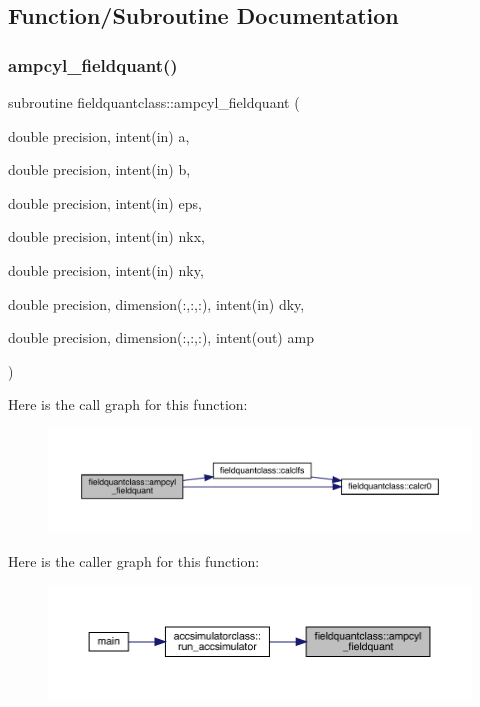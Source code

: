 \subsection{Function/\+Subroutine Documentation}
\mbox{\label{namespacefieldquantclass_a0cf12c2453dd024814caca1b9dbbb9a5}} 
\subsubsection{\texorpdfstring{ampcyl\_fieldquant()}{ampcyl\_fieldquant()}}
{\footnotesize\ttfamily subroutine fieldquantclass\+::ampcyl\+\_\+fieldquant (\begin{DoxyParamCaption}\item[{double precision, intent(in)}]{a,  }\item[{double precision, intent(in)}]{b,  }\item[{double precision, intent(in)}]{eps,  }\item[{double precision, intent(in)}]{nkx,  }\item[{double precision, intent(in)}]{nky,  }\item[{double precision, dimension(\+:,\+:,\+:), intent(in)}]{dky,  }\item[{double precision, dimension(\+:,\+:,\+:), intent(out)}]{amp }\end{DoxyParamCaption})}

Here is the call graph for this function\+:\nopagebreak
\begin{figure}[H]
\begin{center}
\leavevmode
\includegraphics[width=350pt]{namespacefieldquantclass_a0cf12c2453dd024814caca1b9dbbb9a5_cgraph}
\end{center}
\end{figure}
Here is the caller graph for this function\+:\nopagebreak
\begin{figure}[H]
\begin{center}
\leavevmode
\includegraphics[width=350pt]{namespacefieldquantclass_a0cf12c2453dd024814caca1b9dbbb9a5_icgraph}
\end{center}
\end{figure}
\mbox{\label{namespacefieldquantclass_a735a6d51aabd219f525edeb04b034150}} 
